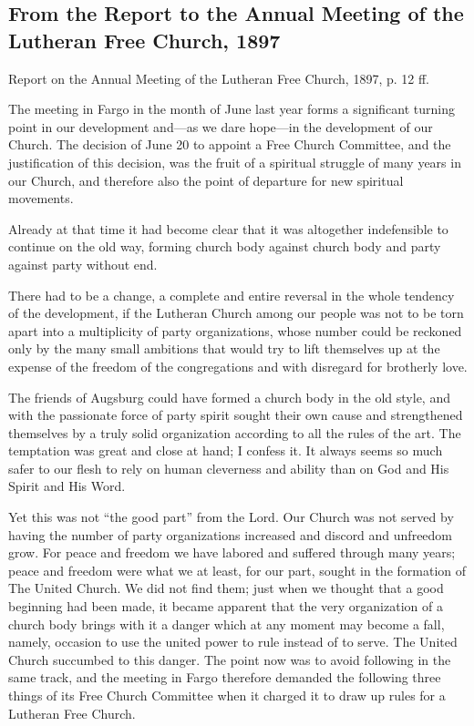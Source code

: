 
\subsection{From the Report to the Annual Meeting of the Lutheran Free Church, 1897}

Report on the Annual Meeting of the Lutheran Free Church, 1897, p. 12 ff.

The meeting in Fargo in the month of June last year forms a significant turning point in our development and—as we dare hope—in the development of our Church. The decision of June 20 to appoint a Free Church Committee, and the justification of this decision, was the fruit of a spiritual struggle of many years in our Church, and therefore also the point of departure for new spiritual movements.

Already at that time it had become clear that it was altogether indefensible to continue on the old way, forming church body against church body and party against party without end.

There had to be a change, a complete and entire reversal in the whole tendency of the development, if the Lutheran Church among our people was not to be torn apart into a multiplicity of party organizations, whose number could be reckoned only by the many small ambitions that would try to lift themselves up at the expense of the freedom of the congregations and with disregard for brotherly love.

The friends of Augsburg could have formed a church body in the old style, and with the passionate force of party spirit sought their own cause and strengthened themselves by a truly solid organization according to all the rules of the art. The temptation was great and close at hand; I confess it. It always seems so much safer to our flesh to rely on human cleverness and ability than on God and His Spirit and His Word.

Yet this was not “the good part” from the Lord. Our Church was not served by having the number of party organizations increased and discord and unfreedom grow. For peace and freedom we have labored and suffered through many years; peace and freedom were what we at least, for our part, sought in the formation of The United Church. We did not find them; just when we thought that a good beginning had been made, it became apparent that the very organization of a church body brings with it a danger which at any moment may become a fall, namely, occasion to use the united power to rule instead of to serve. The United Church succumbed to this danger. The point now was to avoid following in the same track, and the meeting in Fargo therefore demanded the following three things of its Free Church Committee when it charged it to draw up rules for a Lutheran Free Church.

